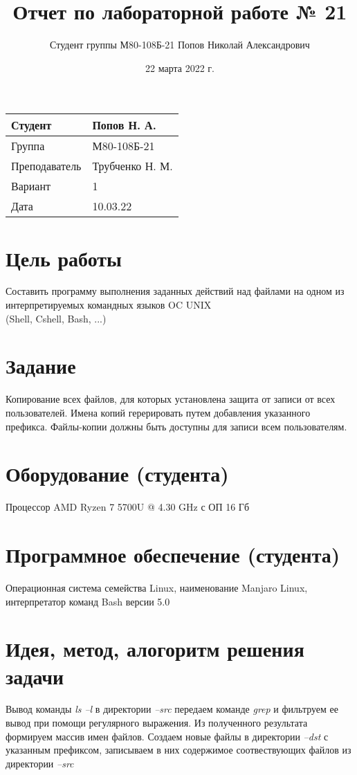\documentclass[a4paper,12pt]{article}
\title{\textbf{Отчет по лабораторной работе № 21}}
\author{Студент группы М80-108Б-21 Попов Николай Александрович}
\date{22 марта 2022 г.}
\begin{document}
\maketitle

\begin{tabular}{|p{4cm}|p{8cm}|}
\hline
Студент & Попов Н. А. \\
\hline
Группа & М80-108Б-21 \\
\hline
Преподаватель & Трубченко Н. М. \\ 
\hline
Вариант & 1 \\
\hline
Дата & 10.03.22 \\
\hline
\end{tabular}

\newpage

\section*{Цель работы}
Составить программу выполнения заданных действий над файлами на одном
из интерпретируемых командных языков OC UNIX \\ (Shell, Cshell, Bash, ...) 

\section*{Задание}
Копирование всех файлов, для которых установлена защита от записи от всех
пользователей. Имена копий герерировать путем добавления указанного префикса.
Файлы-копии должны быть доступны для записи всем пользователям.

\section*{Оборудование (студента)}
Процессор AMD Ryzen 7 5700U @ 4.30 GHz с ОП 16 Гб

\section*{Программное обеспечение (студента)}
Операционная система семейства Linux, наименование Manjaro Linux,
интерпретатор команд Bash версии 5.0

\section*{Идея, метод, алогоритм решения задачи}

Вывод команды \textit{ls --l} в директории \textit{--src} передаем
команде \textit{grep} и фильтруем ее вывод при помощи регулярного выражения.
Из полученного результата формируем массив имен файлов. Создаем новые файлы в директории \textit{--dst} с указанным префиксом, записываем в них содержимое
соотвествующих файлов из директории \textit{--src} \\
\end{document}
